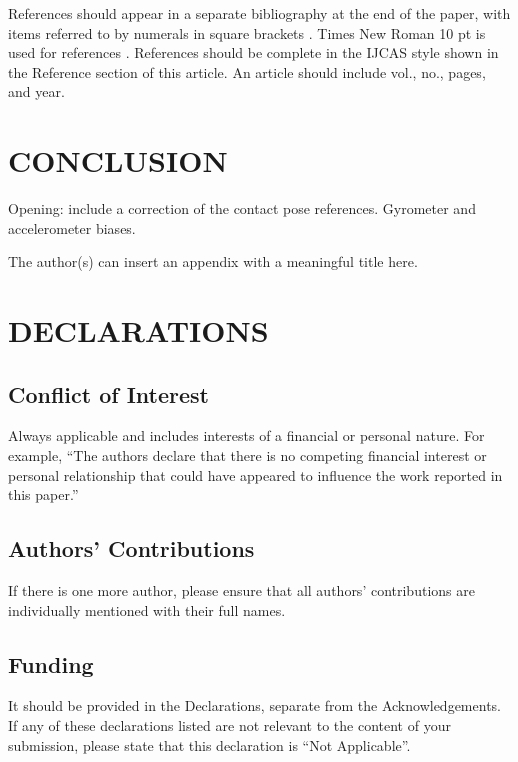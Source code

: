 \documentclass{IJCAS}
\begin{document}
References should appear in a separate bibliography at the end of the paper, with items referred to by numerals in square brackets \cite{1,3,4,5}. Times New Roman 10 pt is used for references \cite{2}. References should be complete in the IJCAS style shown in the Reference section of this article. An article should include vol., no., pages, and year.



\section{CONCLUSION}

Opening: include a correction of the contact pose references.  Gyrometer and accelerometer biases.



\appendix

The author(s) can insert an appendix with a meaningful title here.



\section*{DECLARATIONS}

\subsection*{Conflict of Interest}
Always applicable and includes interests of a financial or personal nature. For example, ``The authors declare that there is no competing financial interest or personal relationship that could have appeared to influence the work reported in this paper.''

\subsection*{Authors' Contributions}
If there is one more author, please ensure that all authors' contributions are individually mentioned with their full names.

\subsection*{Funding }
It should be provided in the Declarations, separate from the Acknowledgements. If any of these declarations listed are not relevant to the content of your submission, please state that this declaration is ``Not Applicable''.
\end{document}
